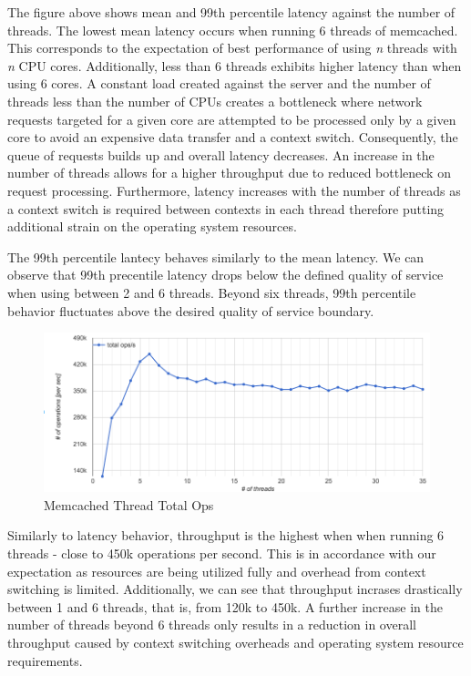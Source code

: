 The figure above shows mean and 99th percentile latency against the
number of threads. The lowest mean latency occurs when running 6 threads
of memcached. This corresponds to the expectation of best performance of
using \emph{n} threads with \emph{n} CPU cores. Additionally, less than
6 threads exhibits higher latency than when using 6 cores. A constant
load created against the server and the number of threads less than the
number of CPUs creates a bottleneck where network requests targeted for
a given core are attempted to be processed only by a given core to avoid
an expensive data transfer and a context switch. Consequently, the queue
of requests builds up and overall latency decreases. An increase in the
number of threads allows for a higher throughput due to reduced
bottleneck on request processing. Furthermore, latency increases with
the number of threads as a context switch is required between contexts
in each thread therefore putting additional strain on the operating
system resources.

The 99th percentile lantecy behaves similarly to the mean latency. We
can observe that 99th precentile latency drops below the defined quality
of service when using between 2 and 6 threads. Beyond six threads, 99th
percentile behavior fluctuates above the desired quality of service
boundary.

\begin{figure}[htbp]
\centering
\includegraphics{./res/5_threads_total_ops.png}
\caption{Memcached Thread Total Ops}
\end{figure}

Similarly to latency behavior, throughput is the highest when when
running 6 threads - close to 450k operations per second. This is in
accordance with our expectation as resources are being utilized fully
and overhead from context switching is limited. Additionally, we can see
that throughput incrases drastically between 1 and 6 threads, that is,
from 120k to 450k. A further increase in the number of threads beyond 6
threads only results in a reduction in overall throughput caused by
context switching overheads and operating system resource requirements.

